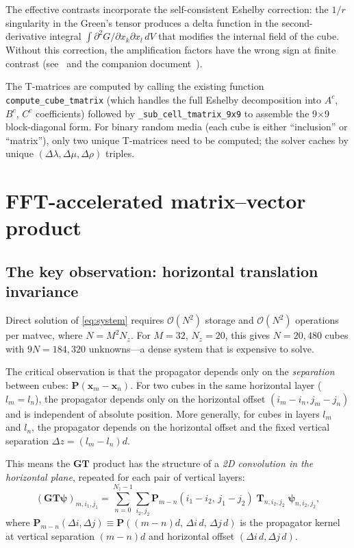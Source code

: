 \documentclass[11pt,a4paper]{article}
\newcommand{\D}{\Delta}
\newcommand{\order}{\mathcal{O}}
\newcommand{\bG}{\bm{G}}
\newcommand{\bT}{\bm{T}}
\newcommand{\bP}{\bm{P}}
\begin{document}
The effective contrasts incorporate the self-consistent Eshelby
correction: the $1/r$ singularity in the Green's tensor produces
a delta function in the second-derivative integral
$\int \partial^2 G / \partial x_k \partial x_l\,dV$ that modifies
the internal field of the cube.  Without this correction, the
amplification factors have the wrong sign at finite contrast
(see~\cite{gubernatis1977} and the companion
document~\cite{cubeeshelby}).

The T-matrices are computed by calling the existing function
\texttt{compute\_cube\_tmatrix} (which handles the full Eshelby
decomposition into $A^c$, $B^c$, $C^c$ coefficients) followed by
\texttt{\_sub\_cell\_tmatrix\_9x9} to assemble the 9$\times$9
block-diagonal form.  For binary random media (each cube is either
``inclusion'' or ``matrix''), only two unique T-matrices need to
be computed; the solver caches by unique $(\D\lambda, \D\mu, \D\rho)$
triples.

\section{FFT-accelerated matrix--vector product}
\label{sec:fft}

\subsection{The key observation: horizontal translation invariance}

Direct solution of \eqref{eq:system} requires $\order(N^2)$ storage
and $\order(N^2)$ operations per matvec, where $N = M^2 N_z$.  For
$M = 32$, $N_z = 20$, this gives $N = 20{,}480$ cubes with
$9N = 184{,}320$ unknowns---a dense system that is expensive to solve.

The critical observation is that the propagator depends only on the
\emph{separation} between cubes:
$\bP(\bm{x}_m - \bm{x}_n)$.  For two cubes in the same horizontal
layer ($l_m = l_n$), the propagator depends only on the horizontal
offset $(i_m - i_n, j_m - j_n)$ and is independent of absolute
position.  More generally, for cubes in layers $l_m$ and $l_n$,
the propagator depends on the horizontal offset and the fixed
vertical separation $\D z = (l_m - l_n) d$.

This means the $\bG \bT$ product has the structure of a
\emph{2D convolution in the horizontal plane}, repeated for each
pair of vertical layers:
\begin{equation}\label{eq:convolution}
  (\bG\bT\bm{\psi})_{m,i_1,j_1}
  = \sum_{n=0}^{N_z-1} \sum_{i_2,j_2}
    \bP_{m-n}(i_1{-}i_2,\, j_1{-}j_2)\;
    \bT_{n,i_2,j_2}\;\bm{\psi}_{n,i_2,j_2},
\end{equation}
where $\bP_{m-n}(\D i, \D j) \equiv
\bP((m{-}n)d,\, \D i\,d,\, \D j\,d)$ is the propagator kernel
at vertical separation $(m-n)d$ and horizontal offset
$(\D i\, d, \D j\, d)$.
\end{document}
